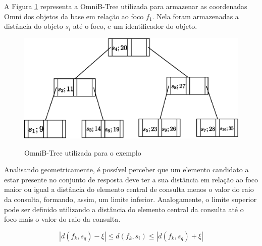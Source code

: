 A Figura \ref{fig:btree} representa a OmniB-Tree utilizada para armazenar as coordenadas Omni dos objetos da base em relação ao foco $f_1$. Nela foram armazenadas
a distância do objeto $s_i$ até o foco, e um identificador do objeto.

\begin{figure}[H]
\centering
\caption{OmniB-Tree utilizada para o exemplo}
\includegraphics[width=.8\textwidth]{dados/figuras/btree.eps}
\label{fig:btree}
\end{figure}

Analisando geometricamente, é possível perceber que um elemento candidato a estar presente no conjunto de resposta deve ter a sua distância em relação ao foco maior ou igual a distância do elemento central de consulta menos o valor do
raio da consulta, formando, assim, um limite inferior. Analogamente, o limite superior pode ser definido utilizando a distância do elemento central da consulta até o foco mais o valor do raio da consulta.

\begin{equation} \label{eq:omnirq}
|d(f_k, s_q) - \xi| \leq d(f_k, s_i) \leq |d(f_k, s_q) + \xi|
\end{equation}

